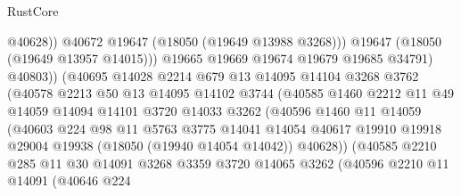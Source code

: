 \begin{lexlean}{RustCore}
\begin{coremodule}
                                  @40628))
                              @40672
                              @19647
                              (@18050 (@19649 @13988 @3268)))
                            @19647
                            (@18050 (@19649 @13957 @14015)))
                          @19665
                          @19669
                          @19674
                          @19679
                          @19685
                          @34791)
                        @40803))
                    (@40695
                      @14028
                      @2214
                      @679
                      @13
                      @14095
                      @14104
                      @3268
                      @3762
                      (@40578
                        @2213
                        @50
                        @13
                        @14095
                        @14102
                        @3744
                        (@40585
                          @1460
                          @2212
                          @11
                          @49
                          @14059
                          @14094
                          @14101
                          @3720
                          @14033
                          @3262
                          (@40596
                            @1460
                            @11
                            @14059
                            (@40603
                              @224
                              @98
                              @11
                              @5763
                              @3775
                              @14041
                              @14054
                              @40617
                              @19910
                              @19918
                              @29004
                              @19938
                              (@18050 (@19940 @14054 @14042))
                              @40628))
                          (@40585
                            @2210
                            @285
                            @11
                            @30
                            @14091
                            @3268
                            @3359
                            @3720
                            @14065
                            @3262
                            (@40596
                              @2210
                              @11
                              @14091
                              (@40646
                                @224

\end{coremodule}
\end{lexlean}
